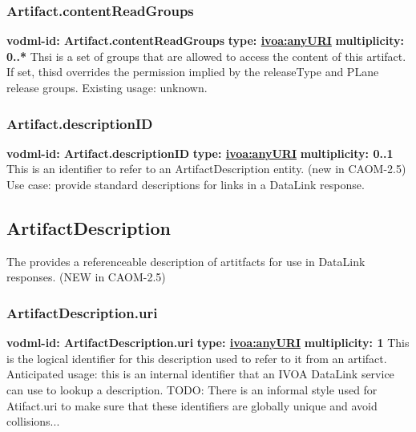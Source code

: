     \subsubsection{Artifact.contentReadGroups}
      \textbf{vodml-id: Artifact.contentReadGroups} \newline
      \textbf{type: \hyperref[sect:ivoa]{ivoa:anyURI}} \newline
      \textbf{multiplicity: 0..*} \newline
      Thsi is a set of groups that are allowed to access the content of this artifact. If set, thisd overrides the permission implied by the releaseType and PLane release groups. Existing usage: unknown.

    \subsubsection{Artifact.descriptionID}
      \textbf{vodml-id: Artifact.descriptionID} \newline
      \textbf{type: \hyperref[sect:ivoa]{ivoa:anyURI}} \newline
      \textbf{multiplicity: 0..1} \newline
      This is an identifier to refer to an ArtifactDescription entity. (new in CAOM-2.5) Use case: provide standard descriptions for links in a DataLink response.

  \subsection{ArtifactDescription}
  \label{sect:ArtifactDescription}
    The provides a referenceable description of artitfacts for use in DataLink responses. (NEW in CAOM-2.5)

    \subsubsection{ArtifactDescription.uri}
      \textbf{vodml-id: ArtifactDescription.uri} \newline
      \textbf{type: \hyperref[sect:ivoa]{ivoa:anyURI}} \newline
      \textbf{multiplicity: 1} \newline
      This is the logical identifier for this description used to refer to it from an artifact. Anticipated usage: this is an internal identifier that an IVOA DataLink service can use to lookup a description. TODO: There is an informal style used for Atifact.uri to make sure that these identifiers are globally unique and avoid collisions...

